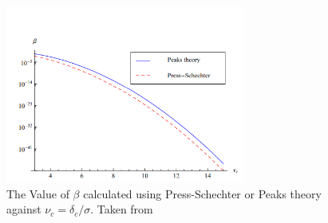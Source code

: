 \begin{figure}[h]
    \centering
    \includegraphics[width=0.7\textwidth]{Peaksvspress.png}
    \caption{The  Value of $\beta$ calculated using Press-Schechter or Peaks theory against $\nu_c = \delta_c/\sigma$. Taken from \cite{Young_2014} }
    \label{fig:3.1}
\end{figure}

